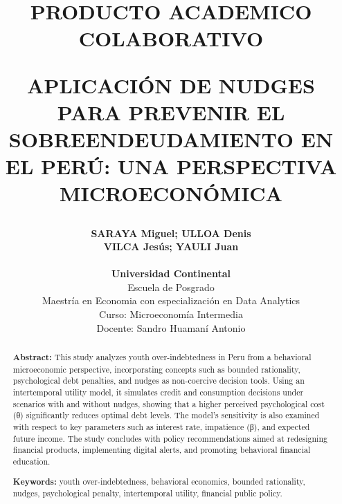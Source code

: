 \documentclass[10pt]{article}
\title{\vspace{0cm} \fontsize{10}{12}\selectfont \textbf{PRODUCTO ACADEMICO COLABORATIVO} 

\vspace{6mm} \textbf{APLICACIÓN DE NUDGES PARA PREVENIR EL SOBREENDEUDAMIENTO EN EL PERÚ: UNA PERSPECTIVA MICROECONÓMICA}\vspace{4mm}}
\author{\fontsize{10}{12}\selectfont \textbf{\fontsize{10}{12}\selectfont SARAYA Miguel; ULLOA Denis} \\ \textbf{\fontsize{10}{12}\selectfont VILCA Jesús; YAULI Juan}\\ \\
\small{\textbf{\fontsize{10}{12}\selectfont Universidad Continental}}\\
\small{\fontsize{10}{12}\selectfont Escuela de Posgrado}\\
\small{\fontsize{10}{12}\selectfont Maestría en Economia con especialización en Data Analytics} \\ \small{\fontsize{10}{12}\selectfont Curso: Microeconomía Intermedia}\\
\small{\fontsize{10}{12}\selectfont Docente: Sandro Huamaní Antonio}
}
\date{\vspace{-6mm}}
\begin{document}
\fontsize{10}{12}\selectfont


\def\tablename{Tabla}%

\setlength{\parskip}{0mm}

\maketitle

\setlength{\parskip}{3mm}


\renewcommand\abstractname{}

\begin{abstract}
    \fontsize{10}{12}\selectfont
    \textbf{Abstract:} This study analyzes youth over-indebtedness in Peru from a behavioral microeconomic perspective, incorporating concepts such as bounded rationality, psychological debt penalties, and nudges as non-coercive decision tools. Using an intertemporal utility model, it simulates credit and consumption decisions under scenarios with and without nudges, showing that a higher perceived psychological cost (θ) significantly reduces optimal debt levels. The model’s sensitivity is also examined with respect to key parameters such as interest rate, impatience (β), and expected future income. The study concludes with policy recommendations aimed at redesigning financial products, implementing digital alerts, and promoting behavioral financial education.

    \vspace{3mm}
    
    \textbf{Keywords:} youth over-indebtedness, behavioral economics, bounded rationality, nudges, psychological penalty, intertemporal utility, financial public policy.
    \vspace{-7mm}
\end{abstract}


\renewcommand\abstractname{}
\end{document}
